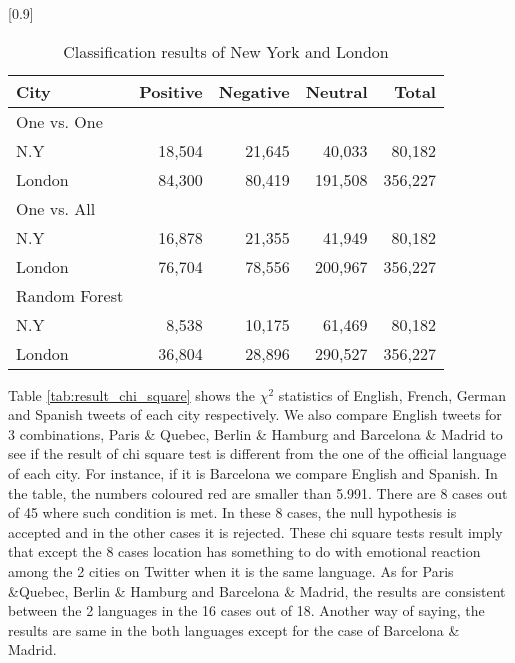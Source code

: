 \documentclass[twocolumn]{article}
\begin{document}
\begin{table}[ht]
	\caption{Classification results of New York and London}
	\scalebox{0.8}[0.9]{
	\begin{tabular}{|l|r|r|r|r|} \hline
	City&Positive&Negative&Neutral&Total\\ \hline \hline
	One vs. One& {} & {} & {} & {}\\ 
	N.Y  & 18,504 & 21,645 & 40,033  & 80,182\\
	London & 84,300& 80,419& 191,508 & 356,227\\ \hline
	One vs. All& {} & {} & {} & {}\\ 
	N.Y  & 16,878& 21,355& 41,949& 80,182\\
	London & 76,704& 78,556& 200,967& 356,227\\ \hline
	Random Forest& {} & {} & {} & {}\\ 
	N.Y  & 8,538 & 10,175 & 61,469& 80,182\\ 
	London & 36,804 & 28,896 & 290,527& 356,227\\ \hline

	\end{tabular}
	}
	\label{tab:result_ny_london}
\end{table}

Table \ref{tab:result_chi_square} shows the $\chi^2$ statistics of English, French, German and Spanish tweets of each city respectively.
We also compare English tweets for 3 combinations, Paris \& Quebec, Berlin \& Hamburg and Barcelona \& Madrid to see if the result of chi square test is different from the one of the official language of each city.
For instance, if it is Barcelona we compare English and Spanish.
In the table, the numbers coloured red are smaller than 5.991.
There are 8 cases out of 45 where such condition is met.
In these 8 cases, the null hypothesis is accepted and in the other cases it is rejected.
These chi square tests result imply that except the 8 cases location has something to do with emotional reaction among the 2 cities on Twitter when it is the same language. 
As for Paris \&Quebec, Berlin \& Hamburg and Barcelona \& Madrid, the results are consistent between the 2 languages in the 16 cases out of 18.
Another way of saying, the results are same in the both languages except for the case of Barcelona \& Madrid.
\end{document}
